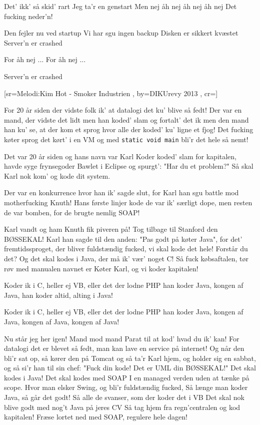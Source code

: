\documentclass[pdftex,12pt]{article}
\begin{document}
\begin{songs}{}
\endverse
\beginverse
Det' ikk'
så skid' rart
Jeg ta'r
en genstart
Men nej
åh nej
åh nej
åh nej
Det fucking neder'n!

\endverse
\beginverse
Den fejler nu ved startup
Vi har sgu ingen backup
Disken er sikkert kvæstet
Server'n er crashed

\endverse
\beginverse
For åh nej ...
For åh nej ...

\endverse
\beginverse
Server'n er crashed

\endverse
\endsong



[sr={Melodi:Kim Hot - Smoker Industrien}
,
by={DIKUrevy 2013}
,
cr={}]\hypertarget{Koder Kapitalen}{}
\label{song80}

\beginverse
For 20 år siden der vidste folk ik'
at datalogi det ku' blive så fedt!
Der var en mand, der vidste det lidt
men han koded' slam og fortalt' det ik
men den mand han ku' se, at der kom et sprog
hvor alle der koded' ku' ligne et fjog!
Det fucking køter sprog det kørt' i en VM
og med \texttt{static void main} bli'r det hele så nemt!

\endverse
\beginverse
Det var 20 år siden og hans navn var Karl Koder
koded' slam for kapitalen, havde syge frynsegoder
Bawlet i Eclipse og spurgt': "Har du et problem?"
Så skal Karl nok kom' og kode dit system.

\endverse
\beginverse
Der var en konkurrence hvor han ik' sagde slut,
for Karl han sgu battle mod motherfucking Knuth!
Hans første linjer kode de var ik' særligt dope,
men resten de var bomben, for de brugte nemlig SOAP!

\endverse
\beginverse
Karl vandt og ham Knuth fik piveren på!
Tog tilbage til Stanford den BØSSEKAL!
Karl han sagde til den anden: "Pas godt på køter Java",
for det' fremtidssproget, der bliver fuldstændig fucked,
vi skal kode det hele! Forstår du det?
Og det skal kodes i Java, der må ik' vær' noget C!
Så fuck købsaftalen, tør røv med manualen
navnet er Køter Karl, og vi koder kapitalen!

\endverse
\beginverse
Koder ik i C,
heller ej VB,
eller det der lodne PHP
han koder Java,
kongen af Java,
han koder altid,
alting i Java!

\endverse
\beginverse
Koder ik i C,
heller ej VB,
eller det der lodne PHP
han koder Java,
kongen af Java,
kongen af Java,
kongen af Java!

\endverse
\beginverse
Nu står jeg her igen! Mand mod mand
Parat til at kod' hvad du ik' kan!
For datalogi det er blevet så fedt,
man kan lave en service på internet!
Og når den bli'r sat op, så kører den på Tomcat
og så ta'r Karl hjem, og holder sig en sabbat,
og så si'r han til sin chef:
"Fuck din kode! Det er UML din BØSSEKAL!"
Det skal kodes i Java! Det skal kodes med SOAP
I en managed verden uden at tænke på scope.
Hvor man elsker Swing, og bli'r fuldstændig fucked,
Så længe man koder Java, så går det godt!
Så alle de svanser, som der koder det i VB
Det skal nok blive godt med nog't Java på jeres CV
Så tag hjem fra regn'centralen og kod kapitalen!
Fræse lortet ned med SOAP, regulere hele dagen!


\end{songs}
\end{document}
